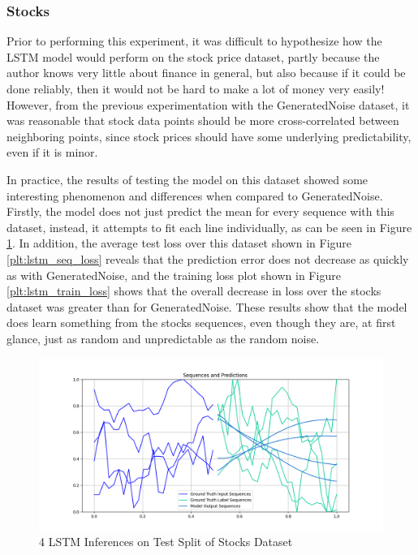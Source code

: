 \documentclass{scrartcl}
\begin{document}
\subsubsection{Stocks}
\label{subsubsec:stocks}

Prior to performing this experiment, it was difficult to hypothesize how the
LSTM model would perform on the stock price dataset, partly because the author
knows very little about finance in general, but also because if it could be
done reliably, then it would not be hard to make a lot of money very easily!
However, from the previous experimentation with the GeneratedNoise dataset, it
was reasonable that stock data points should be more cross-correlated between
neighboring points, since stock prices should have some underlying
predictability, even if it is minor.

In practice, the results of testing the model on this dataset showed some
interesting phenomenon and differences when compared to GeneratedNoise.
Firstly, the model does not just predict the mean for every sequence with this
dataset, instead, it attempts to fit each line individually, as can be seen in
Figure \ref{inf:lstm_stocks_inference}. In addition, the average test loss over
this dataset shown in Figure \ref{plt:lstm_seq_loss} reveals that the
prediction error does not decrease as quickly as with GeneratedNoise, and the
training loss plot shown in Figure \ref{plt:lstm_train_loss} shows that the
overall decrease in loss over the stocks dataset was greater than for
GeneratedNoise. These results show that the model does learn something from the
stocks sequences, even though they are, at first glance, just as random and
unpredictable as the random noise.

\begin{figure}[H]
	\centering
	\includegraphics[width=1\textwidth]{inferences/stocks/3layer_s31.png}
	\caption{4 LSTM Inferences on Test Split of Stocks Dataset}
	\label{inf:lstm_stocks_inference}
\end{figure}
\end{document}
